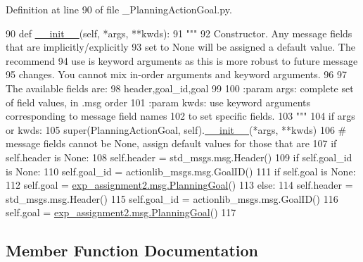 Definition at line 90 of file \+\_\+\+Planning\+Action\+Goal.\+py.


\begin{DoxyCode}
90   \textcolor{keyword}{def }\hyperlink{classstate__machine_1_1Play_a5993a23d8be7f7b2647f71ede0334957}{\_\_init\_\_}(self, *args, **kwds):
91     \textcolor{stringliteral}{"""}
92 \textcolor{stringliteral}{    Constructor. Any message fields that are implicitly/explicitly}
93 \textcolor{stringliteral}{    set to None will be assigned a default value. The recommend}
94 \textcolor{stringliteral}{    use is keyword arguments as this is more robust to future message}
95 \textcolor{stringliteral}{    changes.  You cannot mix in-order arguments and keyword arguments.}
96 \textcolor{stringliteral}{}
97 \textcolor{stringliteral}{    The available fields are:}
98 \textcolor{stringliteral}{       header,goal\_id,goal}
99 \textcolor{stringliteral}{}
100 \textcolor{stringliteral}{    :param args: complete set of field values, in .msg order}
101 \textcolor{stringliteral}{    :param kwds: use keyword arguments corresponding to message field names}
102 \textcolor{stringliteral}{    to set specific fields.}
103 \textcolor{stringliteral}{    """}
104     \textcolor{keywordflow}{if} args \textcolor{keywordflow}{or} kwds:
105       super(PlanningActionGoal, self).\hyperlink{classstate__machine_1_1Play_a5993a23d8be7f7b2647f71ede0334957}{\_\_init\_\_}(*args, **kwds)
106       \textcolor{comment}{# message fields cannot be None, assign default values for those that are}
107       \textcolor{keywordflow}{if} self.header \textcolor{keywordflow}{is} \textcolor{keywordtype}{None}:
108         self.header = std\_msgs.msg.Header()
109       \textcolor{keywordflow}{if} self.goal\_id \textcolor{keywordflow}{is} \textcolor{keywordtype}{None}:
110         self.goal\_id = actionlib\_msgs.msg.GoalID()
111       \textcolor{keywordflow}{if} self.goal \textcolor{keywordflow}{is} \textcolor{keywordtype}{None}:
112         self.goal = \hyperlink{classexp__assignment2_1_1msg_1_1__PlanningGoal_1_1PlanningGoal}{exp\_assignment2.msg.PlanningGoal}()
113     \textcolor{keywordflow}{else}:
114       self.header = std\_msgs.msg.Header()
115       self.goal\_id = actionlib\_msgs.msg.GoalID()
116       self.goal = \hyperlink{classexp__assignment2_1_1msg_1_1__PlanningGoal_1_1PlanningGoal}{exp\_assignment2.msg.PlanningGoal}()
117 
\end{DoxyCode}


\subsection{Member Function Documentation}
\mbox{\label{classexp__assignment2_1_1msg_1_1__PlanningActionGoal_1_1PlanningActionGoal_ab544cb67ea2cf9357fbd3084d2f746e8}} 
